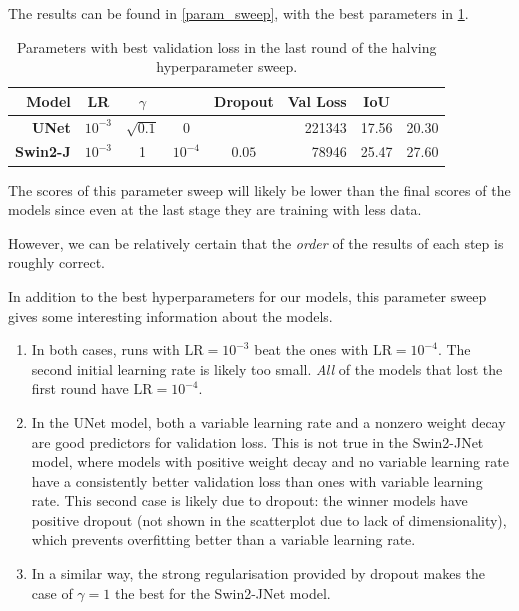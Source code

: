 The results can be found in \cref{param_sweep}, with the best parameters in \cref{param_sweep_results}.

\begin{table}[h]
	\centering
	\small
	\begin{tabular}{>{\bfseries}r | c c c c | r c c}
		\toprule
		Model & LR & $\gamma$ & \lt{} & Dropout & Val Loss & IoU & \iiouc{} \\
		\midrule
		UNet & $10^{-3}$ & $\sqrt{0.1}$ & $0$ & & \num{221343} & 17.56 & 20.30 \\
		Swin2-J & $10^{-3}$ & 1 & $10^{-4}$ & $0.05$ & \num{78946} & 25.47 & 27.60 \\
		\bottomrule
	\end{tabular}
	\caption{Parameters with best validation loss in the last round of the halving hyperparameter sweep.}
	\label{param_sweep_results}
\end{table}

The scores of this parameter sweep will likely be lower than the final scores of the models since even at the last stage they are training with less data.

However, we can be relatively certain that the \emph{order} of the results of each step is roughly correct.

\newpage{}
In addition to the best hyperparameters for our models, this parameter sweep gives some interesting information about the models.
\begin{enumerate}
	\item In both cases, runs with $\text{LR} = 10^{-3}$ beat the ones with $\text{LR} = 10^{-4}$. The second initial learning rate is likely too small.
		\emph{All} of the models that lost the first round have $\text{LR} = 10^{-4}$.
	\item In the UNet model, both a variable learning rate and a nonzero \lt{} weight decay are good predictors for validation loss.
		This is not true in the Swin2-JNet model, where models with positive weight decay and no variable learning rate have a consistently better validation loss than ones with variable learning rate.
		This second case is likely due to dropout: the winner models have positive dropout (not shown in the scatterplot due to lack of dimensionality), which prevents overfitting better than a variable learning rate.
	\item In a similar way, the strong regularisation provided by dropout makes the case of $\gamma = 1$ the best for the Swin2-JNet model.
\end{enumerate}

